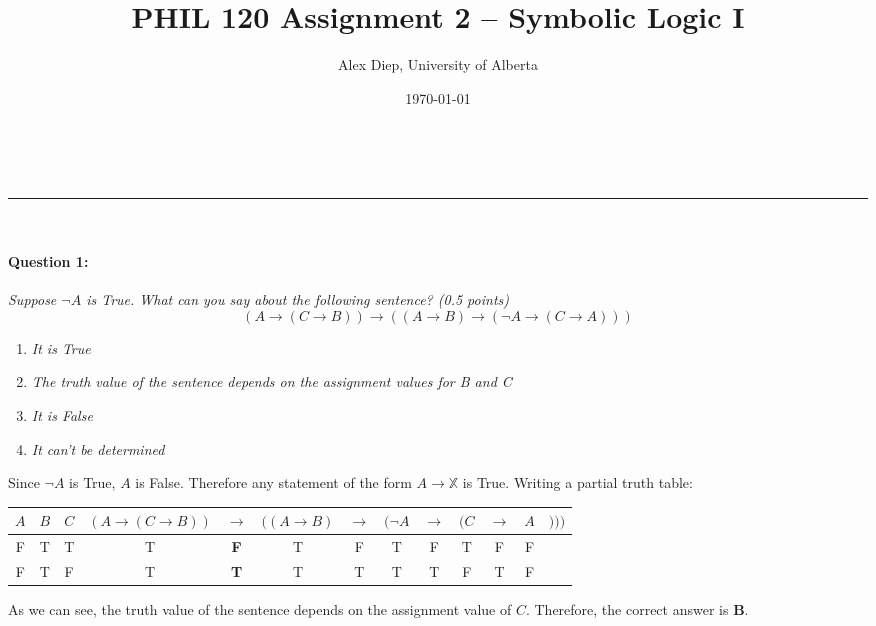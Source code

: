 \documentclass[letterpaper,11pt]{article}
\makeatletter
\newcommand{\linia}{\rule{\linewidth}{0.5pt}}
\theoremstyle{mytheor}
\renewcommand{\maketitle}{
\begin{center}
\vspace{2ex}
{\huge \textsc{\@title}}
\vspace{1ex}
\\
\linia\\
\@author \hfill \@date
\vspace{4ex}
\end{center}
}
\makeatother
\begin{document}
\title{PHIL 120 Assignment 2 -- Symbolic Logic I}

\author{Alex Diep, University of Alberta}

\date{\today}

\maketitle

\paragraph{Question 1:} \textit{Suppose $\neg A$ is True. What can you say about the following sentence? (0.5 points)}
\begin{equation*}
    (A \rightarrow (C \rightarrow B)) \rightarrow ((A \rightarrow B) \rightarrow (\neg A \rightarrow (C \rightarrow A)))
\end{equation*}
\begin{enumerate}[label=\textit{\Alph*:}]
    \item \textit{It is True}
    \item \textit{The truth value of the sentence depends on the assignment values for B and C}
    \item \textit{It is False}
    \item \textit{It can't be determined}
\end{enumerate}
Since $\neg A$ is True, $A$ is False. Therefore any statement of the form $A \rightarrow \mathbb{X}$ is True. Writing a partial truth table:
\begin{table}[h]
    \centering
    \begin{tabular}{c c c|c c c c c c c c c c}
        \toprule
        $A$ & $B$ & $C$ & $(A \to (C \to B))$ & $\to$ & $((A \to B)$ & $\to$ & $(\neg A$ & $\to$ & $(C$ & $\to$ & $A$ & $)))$ \\
        \midrule
        F & T & T & T & \textbf{F} & T & F & T & F & T & F & F \\
        F & T & F & T & \textbf{T} & T & T & T & T & F & T & F \\
        \bottomrule
    \end{tabular}
\end{table}
\begin{framed}
As we can see, the truth value of the sentence depends on the assignment value of $C$. Therefore, the correct answer is \textbf{B}.
\end{framed}
\end{document}
